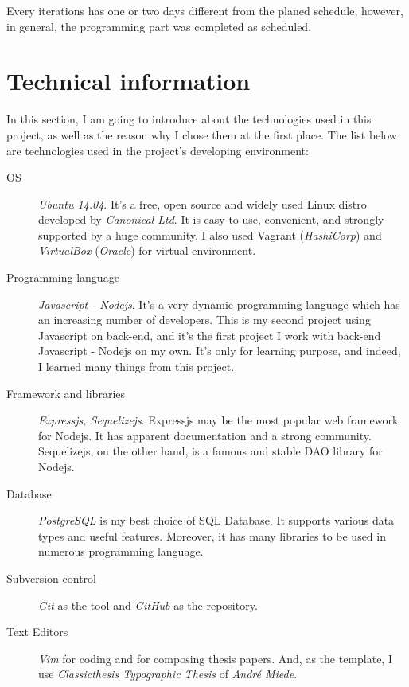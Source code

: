 Every iterations has one or two days different from the planed schedule, however, in general, the programming part was completed as scheduled.


\section{Technical information}
\label{ch:implementation:technical_information} 

In this section, I am going to introduce about the technologies used in this project, as well as the reason why I chose them at the first place.
The list below are technologies used in the project's developing environment:

\begin{description}
\item[OS] \emph{Ubuntu 14.04}.
It's a free, open source and widely used Linux distro developed by \emph{Canonical Ltd}.
It is easy to use, convenient, and strongly supported by a huge community.
I also used {Vagrant} (\emph{HashiCorp}) and \emph{VirtualBox} (\emph{Oracle}) for virtual environment.
\item[Programming language] \emph{Javascript - Nodejs}.
It's a very dynamic programming language which has an increasing number of developers.
This is my second project using Javascript on back-end, and it's the first project I work with back-end Javascript - Nodejs on my own. It's only for learning purpose, and indeed, I learned many things from this project.
\item[Framework and libraries] \emph{Expressjs, Sequelizejs}.
Expressjs may be the most popular web framework for Nodejs.
It has apparent documentation and a strong community.
Sequelizejs, on the other hand, is a famous and stable DAO library for Nodejs.
\item[Database] \emph{PostgreSQL} is my best choice of SQL Database.
It supports various data types and useful features.
Moreover, it has many libraries to be used in numerous programming language.
\item[Subversion control] \emph{Git} as the tool and \emph{GitHub} as the repository.
\item[Text Editors] \emph{Vim} for coding and \latex for composing thesis papers. And, as the \latex template, I use \emph{Classicthesis Typographic Thesis} of \emph{Andr\'{e} Miede}.

\end{description}

